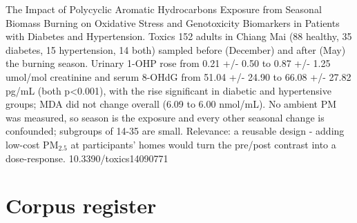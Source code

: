 \documentclass[10pt]{article}
\begin{document}
{The Impact of Polycyclic Aromatic Hydrocarbons Exposure from Seasonal Biomass Burning on Oxidative Stress and Genotoxicity Biomarkers in Patients with Diabetes and Hypertension.}
{Toxics}
{152 adults in Chiang Mai (88 healthy, 35 diabetes, 15 hypertension, 14 both) sampled before (December) and after (May) the burning season. Urinary 1-OHP rose from 0.21 +/- 0.50 to 0.87 +/- 1.25 umol/mol creatinine and serum 8-OHdG from 51.04 +/- 24.90 to 66.08 +/- 27.82 pg/mL (both p<0.001), with the rise significant in diabetic and hypertensive groups; MDA did not change overall (6.09 to 6.00 nmol/mL). No ambient PM was measured, so season is the exposure and every other seasonal change is confounded; subgroups of 14-35 are small. Relevance: a reusable design - adding low-cost PM$_{2.5}$ at participants' homes would turn the pre/post contrast into a dose-response.}
{10.3390/toxics14090771}

\clearpage
\section*{\sffamily\bfseries\color{Deep}Corpus register}
\vspace{-1.5mm}{\color{Amber}\rule{\linewidth}{1.1pt}}\vspace{2.5mm}



\vspace{2mm}
\end{document}
